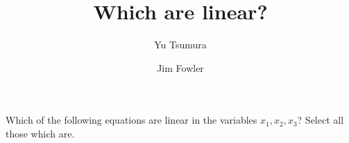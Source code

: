 \documentclass{ximera}
\title{Which are linear?}
\author{Yu Tsumura \and Jim Fowler}
\begin{document}
\begin{problem}
  Which of the following equations are linear in the variables $x_1,x_2,x_3$?  Select all those which are.
  \begin{selectAll}
\end{selectAll}

\end{problem}
	
\end{document}
